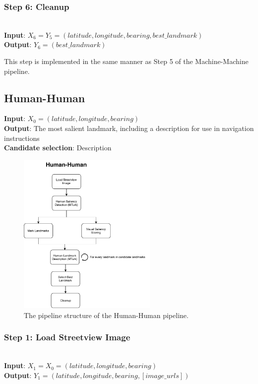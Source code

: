 \subsubsection*{Step 6: Cleanup}~\\
\noindent\textbf{Input}: $X_6 = Y_5 = (latitude, longitude, bearing, best\_landmark)$\\
\textbf{Output}: $Y_6 = (best\_landmark)$

This step is implemented in the same manner as Step 5 of the Machine-Machine pipeline.

\subsection{Human-Human}
\noindent\textbf{Input}: $X_0 = (latitude, longitude, bearing)$\\
\textbf{Output}: The most salient landmark, including a description for use in navigation instructions\\
\textbf{Candidate selection}: Description

\begin{figure}[htbp]
  \centering
  \includegraphics[width=0.6\textwidth]{pipeline_diagrams/human-human.pdf}
  \caption{The pipeline structure of the Human-Human pipeline.}
  \label{fig:pipeline:hh}
\end{figure}

\subsubsection*{Step 1: Load Streetview Image}~\\
\noindent\textbf{Input}: $X_1 = X_0 = (latitude, longitude, bearing)$\\
\textbf{Output}: $Y_1 = (latitude, longitude, bearing, [image\_urls])$

